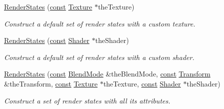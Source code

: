 \begin{DoxyCompactItemize}
\hyperlink{classsf_1_1_render_states_a8f4ca3be0e27dafea0c4ab8547439bb1}{Render\-States} (\hyperlink{term__entry_8h_a57bd63ce7f9a353488880e3de6692d5a}{const} \hyperlink{classsf_1_1_texture}{Texture} $\ast$the\-Texture)
\begin{DoxyCompactList}\small\item\em Construct a default set of render states with a custom texture. \end{DoxyCompactList}\item 
\hyperlink{classsf_1_1_render_states_a39f94233f464739d8d8522f3aefe97d0}{Render\-States} (\hyperlink{term__entry_8h_a57bd63ce7f9a353488880e3de6692d5a}{const} \hyperlink{classsf_1_1_shader}{Shader} $\ast$the\-Shader)
\begin{DoxyCompactList}\small\item\em Construct a default set of render states with a custom shader. \end{DoxyCompactList}\item 
\hyperlink{classsf_1_1_render_states_ab5eda13cd8c79c74eba3b1b0df817d67}{Render\-States} (\hyperlink{term__entry_8h_a57bd63ce7f9a353488880e3de6692d5a}{const} \hyperlink{structsf_1_1_blend_mode}{Blend\-Mode} \&the\-Blend\-Mode, \hyperlink{term__entry_8h_a57bd63ce7f9a353488880e3de6692d5a}{const} \hyperlink{classsf_1_1_transform}{Transform} \&the\-Transform, \hyperlink{term__entry_8h_a57bd63ce7f9a353488880e3de6692d5a}{const} \hyperlink{classsf_1_1_texture}{Texture} $\ast$the\-Texture, \hyperlink{term__entry_8h_a57bd63ce7f9a353488880e3de6692d5a}{const} \hyperlink{classsf_1_1_shader}{Shader} $\ast$the\-Shader)
\begin{DoxyCompactList}\small\item\em Construct a set of render states with all its attributes. \end{DoxyCompactList}\end{DoxyCompactItemize}
